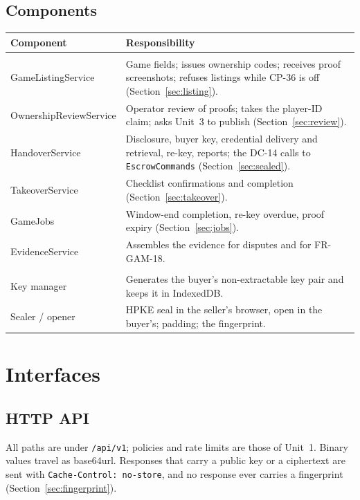 \documentclass[11pt,a4paper]{article}
\newenvironment{dtable}[1]{\small\begin{longtable}{#1}}{\end{longtable}}
\begin{document}
\subsection{Components}
\begin{dtable}{@{}>{\raggedright\arraybackslash}p{4.1cm}>{\raggedright\arraybackslash}p{11.1cm}@{}}
\toprule
\textbf{Component} & \textbf{Responsibility} \\ \midrule \endhead
\multicolumn{2}{@{}l}{\textit{Backend module \texttt{game-accounts}}} \\
GameListingService & Game fields; issues ownership codes; receives proof screenshots; refuses listings while CP-36 is off (Section~\ref{sec:listing}). \\
OwnershipReviewService & Operator review of proofs; takes the player-ID claim; asks Unit~3 to publish (Section~\ref{sec:review}). \\
HandoverService & Disclosure, buyer key, credential delivery and retrieval, re-key, reports; the DC-14 calls to \texttt{EscrowCommands} (Section~\ref{sec:sealed}). \\
TakeoverService & Checklist confirmations and completion (Section~\ref{sec:takeover}). \\
GameJobs & Window-end completion, re-key overdue, proof expiry (Section~\ref{sec:jobs}). \\
EvidenceService & Assembles the evidence for disputes and for FR-GAM-18. \\
\multicolumn{2}{@{}l}{\textit{Browser module \texttt{sealed.js} (Appendix~\ref{app:js}), used by the Unit~8 screens}} \\
Key manager & Generates the buyer's non-extractable key pair and keeps it in IndexedDB. \\
Sealer / opener & HPKE seal in the seller's browser, open in the buyer's; padding; the fingerprint. \\
\bottomrule
\end{dtable}
\section{Interfaces}

\subsection{HTTP API}
\label{sec:api}
All paths are under \texttt{/api/v1}; policies and rate limits are those of Unit~1. Binary values travel as base64url. Responses that carry a public key or a ciphertext are sent with \texttt{Cache-Control: no-store}, and no response ever carries a fingerprint (Section~\ref{sec:fingerprint}).
\end{document}
